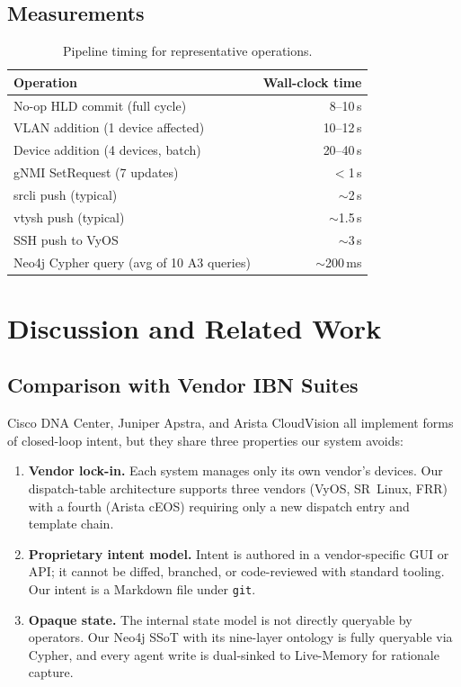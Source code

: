 \documentclass[acmtog]{acmart}
\renewcommand\_{\textunderscore\allowbreak}
\begin{document}
\subsection{Measurements}\label{sec:impl:measurements}

\begin{table}[t]
\small
\centering
\caption{Pipeline timing for representative operations.}
\label{tab:timing}
\begin{tabular}{@{}lr@{}}
\toprule
\textbf{Operation} & \textbf{Wall-clock time}\\
\midrule
No-op HLD commit (full cycle) & 8--10\,s\\
VLAN addition (1 device affected) & 10--12\,s\\
Device addition (4 devices, batch) & 20--40\,s\\
gNMI SetRequest (7 updates) & $<$1\,s\\
sr\_cli push (typical) & $\sim$2\,s\\
vtysh push (typical) & $\sim$1.5\,s\\
SSH push to VyOS & $\sim$3\,s\\
Neo4j Cypher query (avg of 10 A3 queries) & $\sim$200\,ms\\
\bottomrule
\end{tabular}
\end{table}


\section{Discussion and Related Work}\label{sec:discuss}

\subsection{Comparison with Vendor IBN Suites}

Cisco DNA Center, Juniper Apstra, and Arista CloudVision all
implement forms of closed-loop intent, but they share three
properties our system avoids:

\begin{enumerate}
  \item \textbf{Vendor lock-in.} Each system manages only its own
    vendor's devices. Our dispatch-table architecture supports three
    vendors (VyOS, SR~Linux, FRR) with a fourth (Arista cEOS)
    requiring only a new dispatch entry and template chain.

  \item \textbf{Proprietary intent model.} Intent is authored in
    a vendor-specific GUI or API; it cannot be diffed, branched,
    or code-reviewed with standard tooling. Our intent is a
    Markdown file under \texttt{git}.

  \item \textbf{Opaque state.} The internal state model is not
    directly queryable by operators. Our Neo4j SSoT with its
    nine-layer ontology is fully queryable via Cypher, and every
    agent write is dual-sinked to Live-Memory for rationale
    capture.
\end{enumerate}
\end{document}
